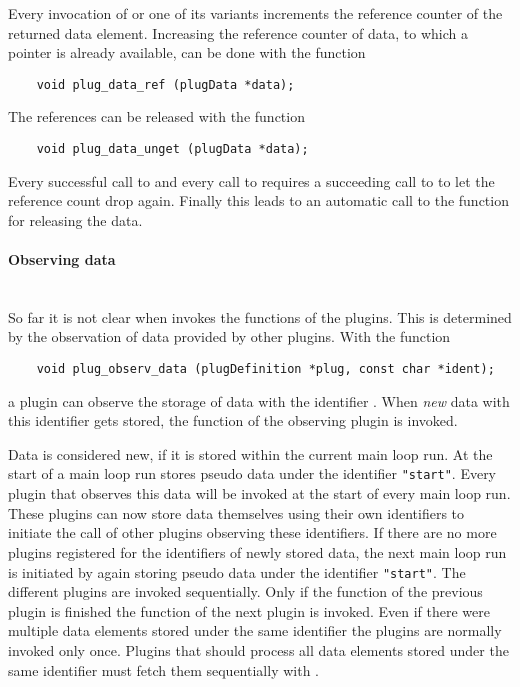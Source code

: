 Every invocation of  or one of its variants
increments the reference counter of the returned data
element. Increasing the reference counter of data, to which a
pointer is already available, can be done with the function
\begin{small}
\linespread{0.9}
\begin{verbatim}
    void plug_data_ref (plugData *data);
\end{verbatim}
\end{small}
The references can be released with the function
\begin{small}
\linespread{0.9}
\begin{verbatim}
    void plug_data_unget (plugData *data);
\end{verbatim}
\end{small}
Every successful call to  and every call to
 requires a succeeding call to
 to let the reference count drop
again. Finally this leads to an automatic call to the
 function for releasing the data.

\paragraph{Observing data}\label{para:observingData}\hfill\\

So far it is not clear when \icewing{} invokes the 
functions of the plugins. This is determined by the observation of
data provided by other plugins. With the function
\begin{small}
\linespread{0.9}
\begin{verbatim}
    void plug_observ_data (plugDefinition *plug, const char *ident);
\end{verbatim}
\end{small}
a plugin can observe the storage of data with the identifier
. When \emph{new} data with this identifier gets stored,
the  function of the observing plugin is invoked.

Data is considered new, if it is stored within the current main loop
run. At the start of a main loop run \icewing{} stores pseudo data
under the identifier \verb|"start"|. Every plugin that observes this
data will be invoked at the start of every main loop run. These
plugins can now store data themselves using their own identifiers to
initiate the call of other plugins observing these identifiers. If
there are no more plugins registered for the identifiers of newly
stored data, the next main loop run is initiated by again storing
pseudo data under the identifier \verb|"start"|. The different
plugins are invoked sequentially. Only if the 
function of the previous plugin is finished the 
function of the next plugin is invoked. Even if there were multiple
data elements stored under the same identifier the plugins are
normally invoked only once. Plugins that should process all data
elements stored under the same identifier must fetch them
sequentially with .

